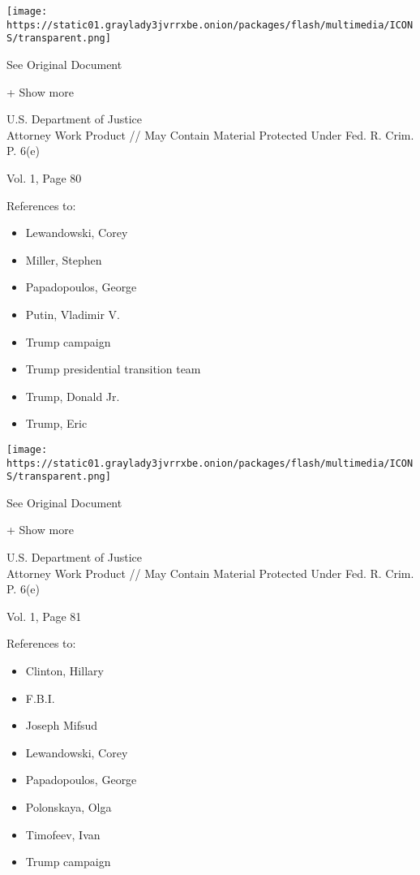 \protect\hyperlink{}{}

\texttt{[image: https://static01.graylady3jvrrxbe.onion/packages/flash/multimedia/ICONS/transparent.png]}

See Original Document

+ Show more

U.S. Department of Justice\\
Attorney Work Product // May Contain Material Protected Under Fed. R.
Crim. P. 6(e)

Vol. 1, Page 80

References to:

\begin{itemize}
\tightlist
\item
  Lewandowski, Corey
\item
  Miller, Stephen
\item
  Papadopoulos, George
\item
  Putin, Vladimir V.
\item
  Trump campaign
\item
  Trump presidential transition team
\item
  Trump, Donald Jr.
\item
  Trump, Eric
\end{itemize}

\protect\hyperlink{}{}

\texttt{[image: https://static01.graylady3jvrrxbe.onion/packages/flash/multimedia/ICONS/transparent.png]}

See Original Document

+ Show more

U.S. Department of Justice\\
Attorney Work Product // May Contain Material Protected Under Fed. R.
Crim. P. 6(e)

Vol. 1, Page 81

References to:

\begin{itemize}
\tightlist
\item
  Clinton, Hillary
\item
  F.B.I.
\item
  Joseph Mifsud
\item
  Lewandowski, Corey
\item
  Papadopoulos, George
\item
  Polonskaya, Olga
\item
  Timofeev, Ivan
\item
  Trump campaign
\end{itemize}

